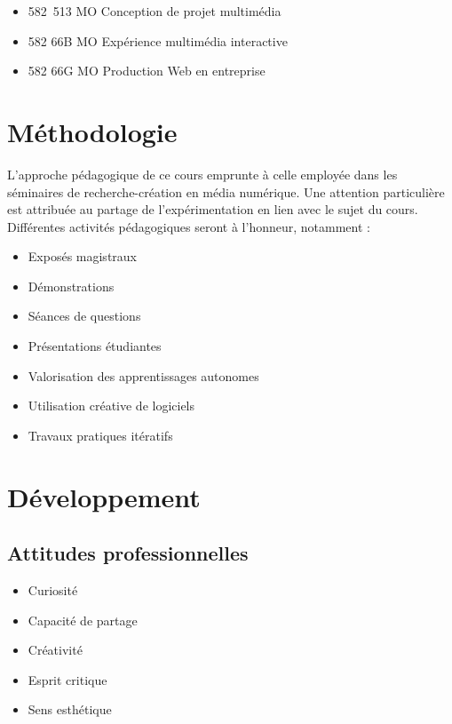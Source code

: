 \documentclass[
]{book}
\providecommand{\tightlist}{%
  \setlength{\itemsep}{0pt}\setlength{\parskip}{0pt}}
\begin{document}
\begin{itemize}
\tightlist
\item
  582~513 MO Conception de projet multimédia
\item
  582 66B MO Expérience multimédia interactive
\item
  582 66G MO Production Web en entreprise
\end{itemize}

\hypertarget{muxe9thodologie}{%
\section{Méthodologie~}\label{muxe9thodologie}}

L'approche pédagogique de ce cours emprunte à celle employée dans les séminaires de recherche-création en média numérique. Une attention particulière est attribuée au partage de l'expérimentation en lien avec le sujet du cours. Différentes activités pédagogiques seront à l'honneur, notamment :

\begin{itemize}
\tightlist
\item
  Exposés magistraux
\item
  Démonstrations
\item
  Séances de questions
\item
  Présentations étudiantes
\item
  Valorisation des apprentissages autonomes
\item
  Utilisation créative de logiciels
\item
  Travaux pratiques itératifs
\end{itemize}

\hypertarget{duxe9veloppement}{%
\section{Développement}\label{duxe9veloppement}}

\hypertarget{attitudes-professionnelles}{%
\subsection{Attitudes professionnelles}\label{attitudes-professionnelles}}

\begin{itemize}
\tightlist
\item
  Curiosité
\item
  Capacité de partage
\item
  Créativité
\item
  Esprit critique
\item
  Sens esthétique
\end{itemize}
\end{document}
